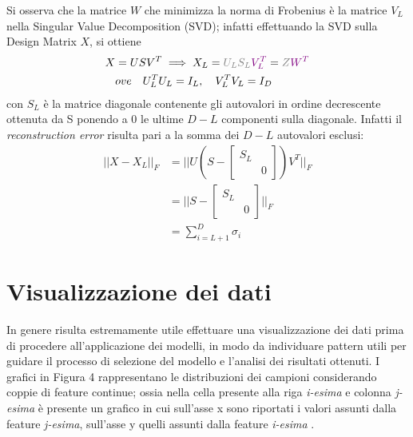 \documentclass[a4paper,8pt]{article}
\begin{document}
\begin{multicols}{2}
Si osserva che la matrice $W$ che minimizza la norma di Frobenius è la matrice $V_L$ nella Singular Value Decomposition (SVD); infatti effettuando la SVD sulla Design Matrix $X$, si ottiene
\begin{equation}
\begin{split}
X &= USV^T
\implies
X_L = \color{gray}U_LS_L\color{violet}V_L^T\color{black} = \color{gray}Z\color{violet}W^T\color{black}\\
&ove\quad U_L^TU_L = I_L, \quad V_L^TV_L = I_D
\end{split}
\end{equation} 
con $S_L$ è la matrice diagonale contenente gli autovalori in ordine decrescente ottenuta da S ponendo a 0 le ultime $D-L$ componenti sulla diagonale. Infatti il \emph{reconstruction error} risulta pari a la somma dei $D - L$ autovalori esclusi:
\begin{equation}
\begin{split}
||X - X_L||_F &= ||U(S- \begin{bmatrix}
       S_L &     \\[0.3em]
          & 0  
     \end{bmatrix}) V^T ||_F\\ 
    &=||S- \begin{bmatrix}
       S_L &     \\[0.3em]
          & 0  
     \end{bmatrix} ||_F\\
     &=\sum_{i=L+1}^{D} \sigma_i
\end{split}
\end{equation}

\section{Visualizzazione dei dati}
In genere risulta estremamente utile effettuare una visualizzazione dei dati prima di procedere all'applicazione dei modelli, in modo da individuare pattern utili per guidare il processo di selezione del modello e l'analisi dei risultati ottenuti. I grafici in Figura 4 rappresentano le distribuzioni dei campioni considerando coppie di feature continue; ossia nella cella presente alla riga \emph{i-esima} e colonna \emph{j-esima} è presente un grafico in cui sull'asse x sono riportati i valori assunti dalla feature \emph{j-esima}, sull'asse y quelli assunti dalla feature \emph{i-esima} .


\end{multicols}
\end{document}
